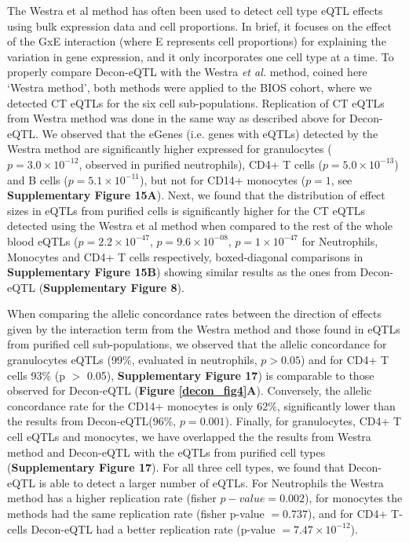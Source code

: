 The Westra et al method has often been used to detect cell type eQTL effects using bulk expression data and cell proportions\cite{davenportDiscoveringVivoCytokineeQTL2018,wilsonMappingTumorSpecificExpression2019,geeleherCancerExpressionQuantitative2018,glastonburyCellTypeHeterogeneityAdipose2019}. In brief, it focuses on the effect of the GxE interaction (where E represents cell proportions) for explaining the variation in gene expression, and it only incorporates one cell type at a time. To properly compare Decon-eQTL with the Westra \textit{et al.} method\cite{westraCellSpecificEQTL2015}, coined here ‘Westra method’, both methods were applied to the BIOS cohort, where we detected CT eQTLs for the six cell sub-populations. Replication of CT eQTLs from Westra method was done in the same way as described above for Decon-eQTL. We observed that the eGenes (i.e. genes with eQTLs) detected by the Westra method are significantly higher expressed for granulocytes ($p = 3.0 \times 10^{-12}$, observed in purified neutrophils), CD4+ T cells ($p = 5.0 \times 10^{-13}$) and B cells ($p = 5.1 \times 10^{-11}$), but not for CD14+ monocytes ($p = 1$, see \textbf{Supplementary Figure 15A}). Next, we found that the distribution of effect sizes in eQTLs from purified cells is significantly higher for the CT eQTLs detected using the Westra et al method when compared to the rest of the whole blood eQTLs ($p = 2.2 \times 10^{-47}$, $p = 9.6 \times 10^{-08}$, $p = 1 \times 10^{-47}$ for Neutrophils, Monocytes and CD4+ T cells respectively, boxed-diagonal comparisons in \textbf{Supplementary Figure 15B}) showing similar results as the ones from Decon-eQTL (\textbf{Supplementary Figure 8}).

When comparing the allelic concordance rates between the direction of effects given by the interaction term from the Westra method and those found in eQTLs from purified cell sub-populations, we observed that the allelic concordance for granulocytes eQTLs (99\%, evaluated in neutrophils, $p > 0.05$) and for CD4+ T cells 93\% (p $>$ 0.05), \textbf{Supplementary Figure 17}) is comparable to those observed for Decon-eQTL (\textbf{Figure \ref{decon_fig4}A}). Conversely, the allelic concordance rate for the CD14+ monocytes is only 62\%, significantly lower than the results from Decon-eQTL(96\%, $p = 0.001$). Finally, for granulocytes, CD4+ T cell eQTLs and monocytes, we have overlapped the the results from Westra method and Decon-eQTL with the eQTLs from purified cell types\cite{chenGeneticDriversEpigenetic2016} (\textbf{Supplementary Figure 17}). For all three cell types, we found that Decon-eQTL is able to detect a larger number of eQTLs. For Neutrophils the Westra method has a higher replication rate (fisher $p-value = 0.002$), for monocytes the methods had the same replication rate (fisher p-value $= 0.737$), and for CD4+ T-cells Decon-eQTL had a better replication rate (p-value $= 7.47 \times 10^{-12}$). 

